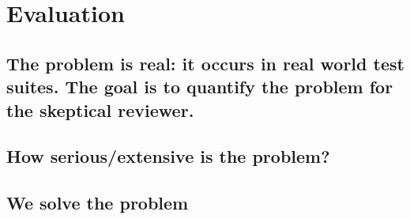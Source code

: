 \section{Evaluation}
\label{sec:eval}

\subsection{The problem is real: it occurs in real world test suites. The goal is to quantify the problem for the skeptical reviewer.}

\subsection{How serious/extensive is the problem?}

\subsection{We solve the problem}
